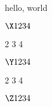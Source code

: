 \documentclass{amsart}
\begin{document}
hello, world

$\X 1 2 3 4$

 2 3 4

$\Y 1 2 3 4$

 2 3 4

$\Z 1 2 3 4$
\end{document}
